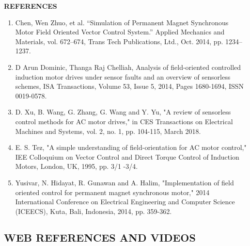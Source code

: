 \newpage


\begin{center}
    {\textbf{REFERENCES}}
\end{center}

\begin{enumerate}
    \item Chen, Wen Zhuo, et al. “Simulation of Permanent Magnet Synchronous Motor Field Oriented Vector Control System.” Applied Mechanics and Materials, vol. 672–674, Trans Tech Publications, Ltd., Oct. 2014, pp. 1234–1237.


          \vspace{5mm} %

    \item D Arun Dominic, Thanga Raj Chelliah,
          Analysis of field-oriented controlled induction motor drives under sensor faults and an overview of sensorless schemes,
          ISA Transactions,
          Volume 53, Issue 5,
          2014,
          Pages 1680-1694,
          ISSN 0019-0578.

          \vspace{5mm} %

    \item D. Xu, B. Wang, G. Zhang, G. Wang and Y. Yu, "A review of sensorless control methods for AC motor drives," in CES Transactions on Electrical Machines and Systems, vol. 2, no. 1, pp. 104-115, March 2018.


          \vspace{5mm} %

    \item  E. S. Tez, "A simple understanding of field-orientation for AC motor control," IEE Colloquium on Vector Control and Direct Torque Control of Induction Motors, London, UK, 1995, pp. 3/1 -3/4.

          \vspace{5mm} %


    \item  Yusivar, N. Hidayat, R. Gunawan and A. Halim, "Implementation of field oriented control for permanent magnet synchronous motor," 2014 International Conference on Electrical Engineering and Computer Science (ICEECS), Kuta, Bali, Indonesia, 2014, pp. 359-362.

\end{enumerate}
\subsection*{WEB REFERENCES AND VIDEOS}



